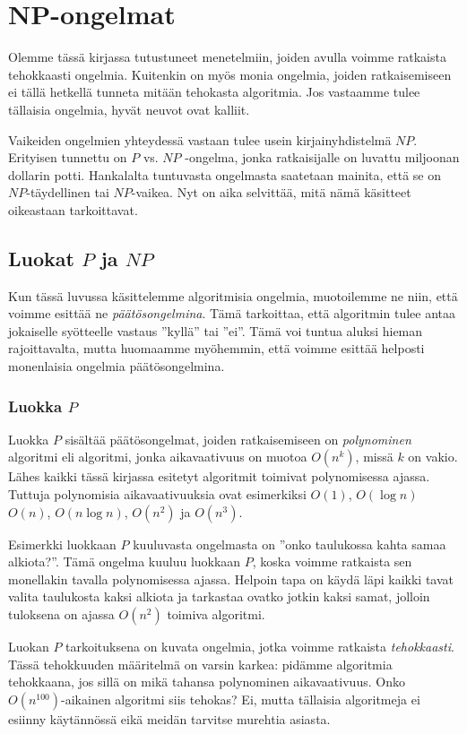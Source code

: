 \chapter{NP-ongelmat}

Olemme tässä kirjassa tutustuneet menetelmiin, joiden avulla voimme
ratkaista tehokkaasti ongelmia.
Kuitenkin on myös monia ongelmia, joiden ratkaisemiseen ei tällä
hetkellä tunneta mitään tehokasta algoritmia.
Jos vastaamme tulee tällaisia ongelmia, hyvät neuvot ovat kalliit.

Vaikeiden ongelmien yhteydessä vastaan tulee usein
kirjainyhdistelmä $NP$.
Erityisen tunnettu on $P$ vs. $NP$ -ongelma,
jonka ratkaisijalle on luvattu miljoonan dollarin potti.
Hankalalta tuntuvasta ongelmasta saatetaan mainita, että
se on $NP$-täydellinen tai $NP$-vaikea.
Nyt on aika selvittää, mitä nämä käsitteet oikeastaan tarkoittavat.

\section{Luokat $P$ ja $NP$}

Kun tässä luvussa käsittelemme algoritmisia ongelmia,
muotoilemme ne niin, että voimme esittää ne \emph{päätösongelmina}.
Tämä tarkoittaa, että algoritmin tulee antaa jokaiselle syötteelle
vastaus ''kyllä'' tai ''ei''.
Tämä voi tuntua aluksi hieman rajoittavalta, mutta huomaamme myöhemmin,
että voimme esittää helposti monenlaisia ongelmia päätösongelmina.

\subsection{Luokka $P$}

Luokka $P$ sisältää päätösongelmat, joiden ratkaisemiseen on
\emph{polynominen} algoritmi eli algoritmi, jonka aikavaativuus
on muotoa $O(n^k)$, missä $k$ on vakio.
Lähes kaikki tässä kirjassa esitetyt algoritmit toimivat
polynomisessa ajassa.
Tuttuja polynomisia aikavaativuuksia ovat esimerkiksi
$O(1)$, $O(\log n)$ $O(n)$, $O(n \log n)$, $O(n^2)$ ja $O(n^3)$.

Esimerkki luokkaan $P$ kuuluvasta ongelmasta on
''onko taulukossa kahta samaa alkiota?''.
Tämä ongelma kuuluu luokkaan $P$, koska voimme ratkaista
sen monellakin tavalla polynomisessa ajassa.
Helpoin tapa on käydä läpi kaikki tavat valita taulukosta
kaksi alkiota ja tarkastaa ovatko jotkin kaksi samat,
jolloin tuloksena on ajassa $O(n^2)$ toimiva algoritmi.

Luokan $P$ tarkoituksena on kuvata ongelmia, jotka voimme
ratkaista \emph{tehokkaasti}.
Tässä tehokkuuden määritelmä on varsin karkea:
pidämme algoritmia tehokkaana, jos sillä on mikä tahansa
polynominen aikavaativuus.
Onko $O(n^{100})$-aikainen algoritmi siis tehokas?
Ei, mutta tällaisia algoritmeja ei esiinny käytännössä
eikä meidän tarvitse murehtia asiasta.

